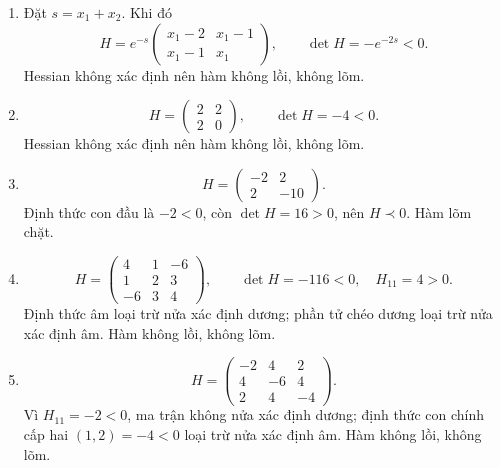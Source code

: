 \documentclass[11pt,a4paper]{article}
\begin{document}
\begin{enumerate}[label=\roman*),leftmargin=*,itemsep=.45em]
\item Đặt \(s=x_1+x_2\). Khi đó
\[
H=e^{-s}\begin{pmatrix}x_1-2&x_1-1\\x_1-1&x_1\end{pmatrix},\qquad \det H=-e^{-2s}<0.
\]
Hessian không xác định nên hàm không lồi, không lõm.
\item \[
H=\begin{pmatrix}2&2\\2&0\end{pmatrix},\qquad \det H=-4<0.
\]
Hessian không xác định nên hàm không lồi, không lõm.
\item \[
H=\begin{pmatrix}-2&2\\2&-10\end{pmatrix}.
\]
Định thức con đầu là \(-2<0\), còn \(\det H=16>0\), nên \(H\prec0\). Hàm lõm chặt.
\item \[
H=\begin{pmatrix}4&1&-6\\1&2&3\\-6&3&4\end{pmatrix},\qquad \det H=-116<0,\quad H_{11}=4>0.
\]
Định thức âm loại trừ nửa xác định dương; phần tử chéo dương loại trừ nửa xác định âm. Hàm không lồi, không lõm.
\item \[
H=\begin{pmatrix}-2&4&2\\4&-6&4\\2&4&-4\end{pmatrix}.
\]
Vì \(H_{11}=-2<0\), ma trận không nửa xác định dương; định thức con chính cấp hai \((1,2)=-4<0\) loại trừ nửa xác định âm. Hàm không lồi, không lõm.
\end{enumerate}

\end{document}
